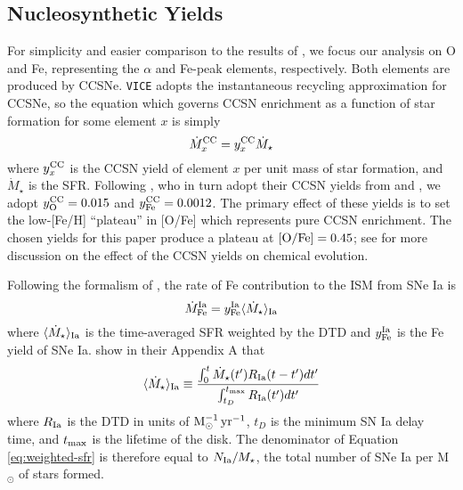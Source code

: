 \documentclass[twocolumn,twocolappendix,linenumbers]{aastex631}
\newcommand{\vice}{{\tt VICE}\xspace}
\begin{document}
\subsection{Nucleosynthetic Yields}
\label{sec:yields}

For simplicity and easier comparison to the results of , we focus our analysis on O and Fe, representing the $\alpha$ and Fe-peak elements, respectively. Both elements are produced by CCSNe. \vice adopts the instantaneous recycling approximation for CCSNe, so the equation which governs CCSN enrichment as a function of star formation for some element $x$ is simply
\begin{equation}
    \dot M_x^{\rm CC} = y_x^{\rm CC} \dot M_\star
    \label{eq:ccsn-enrichment}
\end{equation}
where $y_x^{\rm CC}$ is the CCSN yield of element $x$ per unit mass of star formation, and $\dot M_\star$ is the SFR. 
Following , who in turn adopt their CCSN yields from \citet{ChieffiLimongi2004-CCSNYields} and \citet{LimongiChieffi2006-CCSNYields}, we adopt $y_{\rm O}^{\rm CC}=0.015$ and $y_{\rm Fe}^{\rm CC}=0.0012$. The primary effect of these yields is to set the low-[Fe/H] ``plateau'' in [O/Fe] which represents pure CCSN enrichment. The chosen yields for this paper produce a plateau at ${\rm [O/Fe]}=0.45$; see \citet{Weinberg2023-CCSNYield} for more discussion on the effect of the CCSN yields on chemical evolution.

Following the formalism of \citet{Weinberg2017-ChemicalEquilibrium}, the rate of Fe contribution to the ISM from SNe Ia is 
\begin{equation}
    \dot M_{\rm Fe}^{\rm Ia} = y_{\rm Fe}^{\rm Ia} \langle \dot M_\star\rangle_{\rm Ia} \\
\end{equation}
where $\langle \dot M_\star\rangle_{\rm Ia}$ is the time-averaged SFR weighted by the DTD and $y_{\rm Fe}^{\rm Ia}$ is the Fe yield of SNe Ia. \citet{Weinberg2017-ChemicalEquilibrium} show in their Appendix A that
\begin{equation}
    \langle \dot M_\star\rangle_{\rm Ia} \equiv \frac{\int_0^t \dot M_\star(t')R_{\rm Ia}(t-t')dt'}{\int_{t_D}^{t_{\rm max}} R_{\rm Ia}(t')dt'}
    \label{eq:weighted-sfr}
\end{equation}
where %
$R_{\rm Ia}$ is the DTD in units of ${\rm M}_\odot^{-1}\,{\rm yr}^{-1}$,
$t_D$ is the minimum SN Ia delay time, and $t_{\rm max}$ is the lifetime of the disk. The denominator of Equation \ref{eq:weighted-sfr} is therefore equal to $N_{\rm Ia}/M_\star$, the total number of SNe Ia per M$_{\odot}$ of stars formed.
\end{document}
